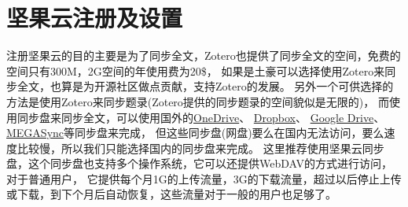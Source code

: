 \documentclass[cn,11pt,chinese]{elegantbook}
\begin{document}
		\section{坚果云注册及设置}\label{sec:jianguoReg}
		注册坚果云的目的主要是为了同步全文，Zotero也提供了同步全文的空间，免费的空间只有300M，2G空间的年使用费为20\$，
		如果是土豪可以选择使用Zotero来同步全文，也算是为开源社区做点贡献，支持Zotero的发展。
		另外一个可供选择的方法是使用Zotero来同步题录(Zotero提供的同步题录的空间貌似是无限的)，
		而使用同步盘来同步全文，可以使用国外的\href{https://office.live.com/start/OneDrive.aspx}{OneDrive}、
		\href{https://www.dropbox.com/}{Dropbox}、
		\href{https://www.google.com/drive/}{Google Drive}、\href{https://mega.nz/}{MEGASync}等同步盘来完成，
		但这些同步盘(网盘)要么在国内无法访问，要么速度比较慢，所以我们只能选择国内的同步盘来完成。 
		这里推荐使用坚果云同步盘，这个同步盘也支持多个操作系统，它可以还提供WebDAV的方式进行访问，对于普通用户，
		它提供每个月1G的上传流量，3G的下载流量，超过以后停止上传或下载，到下个月后自动恢复，这些流量对于一般的用户也足够了。
\end{document}
